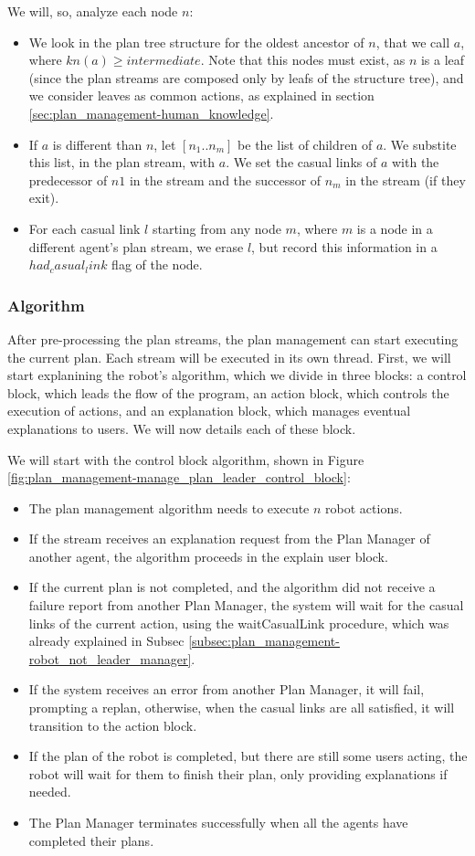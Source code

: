 We will, so, analyze each node $n$:
\begin{itemize}
\item We look in the plan tree structure for the oldest ancestor of $n$, that we call $a$, where $kn(a) \geq intermediate$. Note that this nodes must exist, as $n$ is a leaf (since the plan streams are composed only by leafs of the structure tree), and we consider leaves as common actions, as explained in section \ref{sec:plan_management-human_knowledge}.

\item If $a$ is different than $n$, let $[n_1..n_m]$ be the list of children of $a$. We substite this list, in the plan stream, with $a$. We set the casual links of $a$ with the predecessor of $n1$ in the stream and the successor of $n_m$ in the stream (if they exit).
\item For each casual link $l$ starting from any node $m$, where $m$ is a node in a different agent's plan stream, we erase $l$, but record this information in a $had_casual_link$ flag of the node.
\end{itemize}


\subsubsection{Algorithm}
After pre-processing the plan streams, the plan management can start executing the current plan. Each stream will be executed in its own thread. First, we will start explanining the robot's algorithm, which we divide in three blocks: a control block, which leads the flow of the program, an action block, which controls the execution of actions, and an explanation block, which manages eventual explanations to users. We will now details each of these block.

We will start with the control block algorithm, shown in Figure \ref{fig:plan_management-manage_plan_leader_control_block}:
\begin{itemize}
\item The plan management algorithm needs to execute $n$ robot actions.
\item If the stream receives an explanation request from the Plan Manager of another agent, the algorithm proceeds in the explain user block.
\item If the current plan is not completed, and the algorithm did not receive a failure report from another Plan Manager, the system will wait for the casual links of the current action, using the waitCasualLink procedure, which was already explained in Subsec \ref{subsec:plan_management-robot_not_leader_manager}.
\item If the system receives an error from another Plan Manager, it will fail, prompting a replan, otherwise, when the casual links are all satisfied, it will transition to the action block.
\item If the plan of the robot is completed, but there are still some users acting, the robot will wait for them to finish their plan, only providing explanations if needed.
\item The Plan Manager terminates successfully when all the agents have completed their plans.
\end{itemize}


